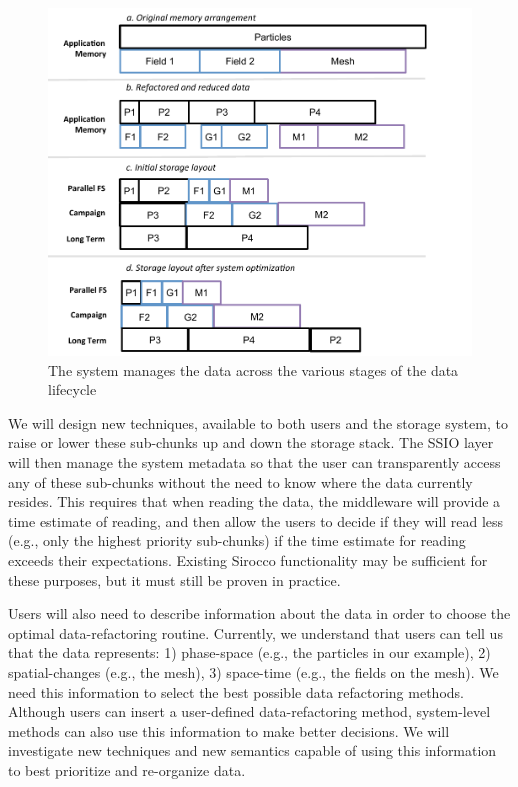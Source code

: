 \begin{figure}
        \begin{centering} 
	\includegraphics[scale=0.75]{graphics/SSIO-bucket.pdf}
        \caption{The system manages the data across the various stages of the data lifecycle}
        \label{fig:ssio-bucket}
        \end{centering}
\end{figure}


We will design new techniques, available to both users and the storage system,
to raise or lower these sub-chunks up and
down the storage stack. The SSIO layer will then manage the system metadata so
that the user can transparently access any of these sub-chunks without
the need to know where the data currently resides.
This requires that when reading the data, the middleware will
provide a time estimate of reading, and then allow the users to decide if
they will read less (e.g., only the highest priority sub-chunks)
if the time estimate
for reading exceeds their expectations. Existing Sirocco functionality may be
sufficient for these purposes, but it must still be proven in practice.
%

Users will also need to describe information about the data in order to choose
the optimal data-refactoring routine. Currently, we understand that
users can tell us that the data represents: 1) phase-space (e.g., the particles
in our example), 2) spatial-changes (e.g., the mesh), 3) space-time (e.g.,
the fields on the mesh). We need this information to select
the best possible data
refactoring methods. Although users can insert a user-defined data-refactoring
method, system-level methods can also use this information to make better decisions.
We will investigate new techniques and new semantics capable of using
this information to best prioritize and re-organize data.

